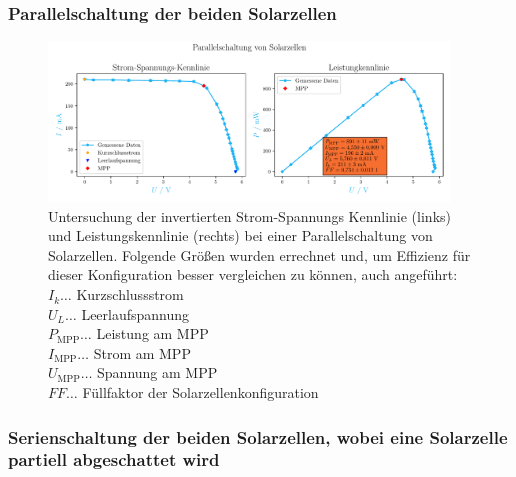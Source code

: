 \documentclass[12pt,english,ngerman]{scrartcl}
\begin{document}
\subsubsection{Parallelschaltung der beiden Solarzellen}
\begin{figure}[H]
	\centering
	\includegraphics[width=0.95\textwidth]{figures/parallelschaltung.pdf}
	\caption[Kennlinien Parallelschaltung Solarzellen]{Untersuchung der invertierten
		Strom-Spannungs Kennlinie (links) und Leistungskennlinie (rechts) bei einer
		Parallelschaltung von Solarzellen. Folgende Größen wurden errechnet und, um
		Effizienz für dieser Konfiguration besser vergleichen zu können, auch
		angeführt:                           \\
		$I_k \dots$ Kurzschlussstrom         \\
		$U_L \dots$ Leerlaufspannung         \\
		$P_\text{MPP} \dots$ Leistung am MPP \\
		$I_\text{MPP} \dots$ Strom am MPP    \\
		$U_\text{MPP} \dots$ Spannung am MPP \\
		$FF \dots$ Füllfaktor der Solarzellenkonfiguration
	}\label{fig:auws_kennlinie_parallel}
\end{figure}

\subsubsection{Serienschaltung der beiden Solarzellen, wobei eine Solarzelle partiell abgeschattet wird}
\end{document}
